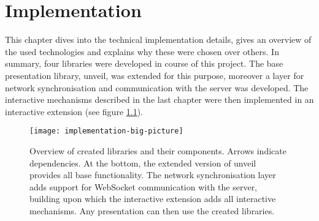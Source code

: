 \chapter{Implementation}
\label{cha:implementation}



This chapter dives into the technical implementation details, gives an over\-view of the used technologies and explains why these were chosen over others. In summary, four libraries were developed in course of this project. The base presentation library, unveil, was extended for this purpose, moreover a layer for network synchronisation and communication with the server was developed. The interactive mechanisms described in the last chapter were then implemented in an interactive extension (see figure \ref{fig:implementation-big-picture}).

\begin{figure}
\centering
\texttt{[image: implementation-big-picture]}
\caption{Overview of created libraries and their components. Arrows indicate dependencies. At the bottom, the extended version of unveil provides all base functionality. The network synchronisation layer adds support for WebSocket communication with the server, building upon which the interactive extension adds all interactive mechanisms. Any presentation can then use the created libraries.}
\label{fig:implementation-big-picture}
\end{figure}

